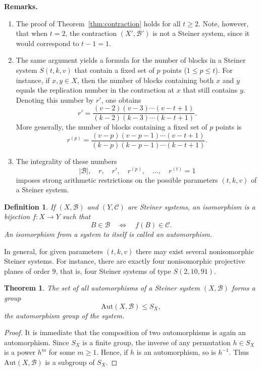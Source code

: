 \documentclass[12pt,a4paper,openany]{book}
\newtheorem{theorem}{Theorem}[section]
\newtheorem{definition}{Definition}[section]
\newcommand{\Aut}{\mathrm{Aut}}
\begin{document}
\noindent\textbf{Remarks.}
\begin{enumerate}
    \item The proof of Theorem~\ref{thm:contraction} holds for all $t \geq 2$. 
    Note, however, that when $t=2$, the contraction $(X', \mathscr{B}')$ is not a Steiner system, since it would correspond to $t-1=1$.
    
    \item The same argument yields a formula for the number of blocks in a Steiner system $S(t, k, v)$ that contain a fixed set of $p$ points ($1 \leq p \leq t$).  
    For instance, if $x,y \in X$, then the number of blocks containing both $x$ and $y$ equals the replication number in the contraction at $x$ that still contains $y$. Denoting this number by $r'$, one obtains
    \[
    r' = \frac{(v-2)(v-3)\cdots(v-t+1)}{(k-2)(k-3)\cdots(k-t+1)}.
    \]
    More generally, the number of blocks containing a fixed set of $p$ points is
    \[
    r^{(p)} = \frac{(v-p)(v-p-1)\cdots(v-t+1)}{(k-p)(k-p-1)\cdots(k-t+1)}.
    \]

    \item The integrality of these numbers 
    \[
    |\mathscr{B}|, \quad r, \quad r', \quad r^{(p)}, \quad \dots, \quad r^{(t)}=1
    \]
    imposes strong arithmetic restrictions on the possible parameters $(t,k,v)$ of a Steiner system.
\end{enumerate}

\begin{definition}
If $(X, \mathscr{B})$ and $(Y, \mathscr{C})$ are Steiner systems, an \emph{isomorphism} is a bijection $f : X \to Y$ such that 
\[
B \in \mathscr{B} \quad \Longleftrightarrow \quad f(B) \in \mathscr{C}.
\]
An isomorphism from a system to itself is called an \emph{automorphism}.
\end{definition}

In general, for given parameters $(t, k, v)$ there may exist several nonisomorphic Steiner systems. 
For instance, there are exactly four nonisomorphic projective planes of order $9$, that is, four Steiner systems of type $S(2, 10, 91)$.

\begin{theorem}\label{thm:aut-group}
The set of all automorphisms of a Steiner system $(X, \mathscr{B})$ forms a group
\[
\Aut(X, \mathscr{B}) \leq S_X,
\]
the automorphism group of the system.
\end{theorem}

\begin{proof}
It is immediate that the composition of two automorphisms is again an automorphism. 
Since $S_X$ is a finite group, the inverse of any permutation $h \in S_X$ is a power $h^m$ for some $m \geq 1$. 
Hence, if $h$ is an automorphism, so is $h^{-1}$. 
Thus $\Aut(X, \mathscr{B})$ is a subgroup of $S_X$.
\end{proof}
\end{document}
